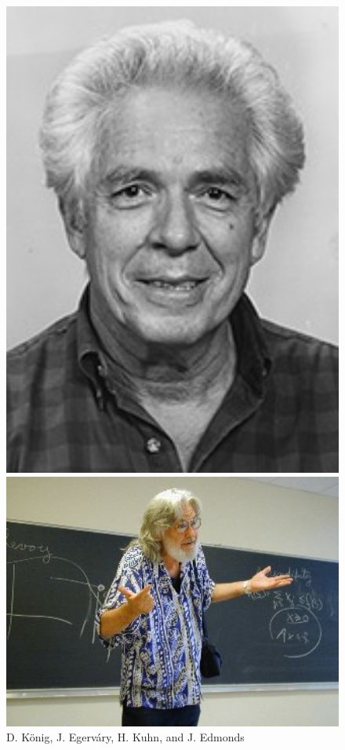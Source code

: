 \documentclass[mathserif]{beamer}
\begin{document}
{\begin{figure}
\begin{center}
\begin{minipage}{0.2\textwidth}
      \includegraphics[width=1.0\textwidth]{Kuhn.jpg}%
     \end{minipage}%
     \quad
     \begin{minipage}{0.2\textwidth}
      \includegraphics[width=1.0\textwidth]{Edmonds.jpg}%
     \end{minipage}%

   \end{center}
   \caption{D. K\"{o}nig, J. Egerv\'{a}ry,  H. Kuhn, and J. Edmonds}
 \end{figure}

}
\end{document}
